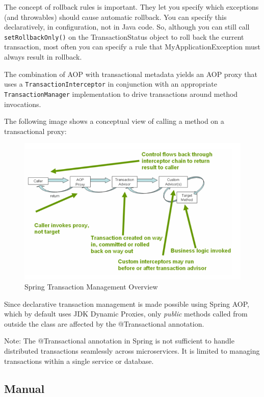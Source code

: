 \documentclass{scrartcl}
\begin{document}
The concept of rollback rules is important. They let you specify which exceptions (and throwables) should cause automatic rollback. You can specify this declaratively, in configuration, not in Java code. So, although you can still call \lstinline|setRollbackOnly()| on the TransactionStatus object to roll back the current transaction, most often you can specify a rule that MyApplicationException must always result in rollback.

The combination of AOP with transactional metadata yields an AOP proxy that uses a \lstinline|TransactionInterceptor| in conjunction with an appropriate \lstinline|TransactionManager| implementation to drive transactions around method invocations.

The following image shows a conceptual view of calling a method on a transactional proxy:

\begin{figure}[h]
    \centering
    \includegraphics[width=1\linewidth]{transactions-aop}
    \caption{Spring Transaction Management Overview}
    \label{fig:transactions-aop}
\end{figure}

Since declarative transaction management is made possible using Spring AOP, which by default uses JDK Dynamic Proxies, only \textit{public} methods called from outside the class are affected by the @Transactional annotation.

Note: The @Transactional annotation in Spring is not sufficient to handle distributed transactions seamlessly across microservices. It is limited to managing transactions within a single service or database.


\subsection{Manual}
\end{document}

